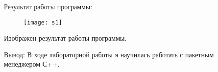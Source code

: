 \endgroup
\begin{center}
Результат работы программы:
\end{center}
\begin{figure}[h!]
	\centering
	\texttt{[image: s1]}
	\label{fig:s1}
\end{figure}
Изображен результат работы программы.

Вывод: В ходе лабораторной работы я научилась работать с пакетным менеджером С++.



